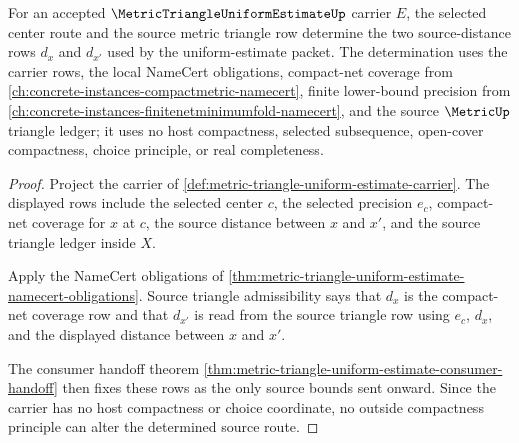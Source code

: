 \begin{theorem}
\label{thm:metric-triangle-uniform-estimate-source-triangle-coherence}
For an accepted $\MetricTriangleUniformEstimateUp$ carrier $E$, the selected center route and the source metric triangle row determine the two source-distance rows $d_x$ and $d_{x'}$ used by the uniform-estimate packet. The determination uses the carrier rows, the local NameCert obligations, compact-net coverage from \autoref{ch:concrete-instances-compactmetric-namecert}, finite lower-bound precision from \autoref{ch:concrete-instances-finitenetminimumfold-namecert}, and the source $\MetricUp$ triangle ledger; it uses no host compactness, selected subsequence, open-cover compactness, choice principle, or real completeness.
\end{theorem}
\begin{proof}
Project the carrier of \autoref{def:metric-triangle-uniform-estimate-carrier}. The displayed rows include the selected center $c$, the selected precision $e_c$, compact-net coverage for $x$ at $c$, the source distance between $x$ and $x'$, and the source triangle ledger inside $X$.

Apply the NameCert obligations of \autoref{thm:metric-triangle-uniform-estimate-namecert-obligations}. Source triangle admissibility says that $d_x$ is the compact-net coverage row and that $d_{x'}$ is read from the source triangle row using $e_c$, $d_x$, and the displayed distance between $x$ and $x'$.

The consumer handoff theorem \autoref{thm:metric-triangle-uniform-estimate-consumer-handoff} then fixes these rows as the only source bounds sent onward. Since the carrier has no host compactness or choice coordinate, no outside compactness principle can alter the determined source route.
\end{proof}

